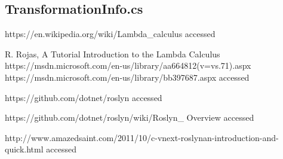 \documentclass[]{report}
\begin{document}
    \subsection{TransformationInfo.cs}
    
    \pagebreak
 
                  
    
    
\begin{thebibliography}{80}
     https://en.wikipedia.org/wiki/Lambda\_calculus accessed \date{01.05.2017}
     R. Rojas, A Tutorial Introduction to the Lambda Calculus
     https://msdn.microsoft.com/en-us/library/aa664812(v=vs.71).aspx
     https://msdn.microsoft.com/en-us/library/bb397687.aspx
    accessed \date{01.05.2017}
     https://github.com/dotnet/roslyn
    accessed \date{01.05.2017}
     https://github.com/dotnet/roslyn/wiki/Roslyn\_ Overview
    accessed \date{01.05.2017}
     http://www.amazedsaint.com/2011/10/c-vnext-roslynan-introduction-and-quick.html
    accessed \date{02.05.2017}
    

\end{thebibliography}
\end{document}
